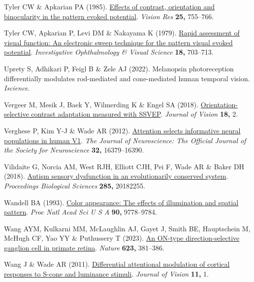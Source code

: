 \documentclass[
  letterpaper,
  DIV=11,
  numbers=noendperiod]{scrartcl}
\newlength{\cslhangindent}
\newenvironment{CSLReferences}[2] %
 {\begin{list}{}{%
  \setlength{\itemindent}{0pt}
  \setlength{\leftmargin}{0pt}
  \setlength{\parsep}{0pt}
  \ifodd #1
   \setlength{\leftmargin}{\cslhangindent}
   \setlength{\itemindent}{-1\cslhangindent}
  \fi
  \setlength{\itemsep}{#2\baselineskip}}}
 {\end{list}}
\begin{document}
\begin{CSLReferences}{1}{1}
Tyler CW \& Apkarian PA (1985).
\href{https://doi.org/10.1016/0042-6989(85)90183-x}{Effects of contrast,
orientation and binocularity in the pattern evoked potential}.
\emph{Vision Res} \textbf{25,} 755--766.

Tyler CW, Apkarian P, Levi DM \& Nakayama K (1979).
\href{https://www.ncbi.nlm.nih.gov/pubmed/447469}{Rapid assessment of
visual function: An electronic sweep technique for the pattern visual
evoked potential}. \emph{Investigative Ophthalmology \& Visual Science}
\textbf{18,} 703--713.

Uprety S, Adhikari P, Feigl B \& Zele AJ (2022). Melanopsin
photoreception differentially modulates rod-mediated and cone-mediated
human temporal vision. \emph{Iscience}.

Vergeer M, Mesik J, Baek Y, Wilmerding K \& Engel SA (2018).
\href{https://doi.org/10.1167/18.5.2}{Orientation-selective contrast
adaptation measured with {SSVEP}}. \emph{Journal of Vision} \textbf{18,}
2.

Verghese P, Kim Y-J \& Wade AR (2012).
\href{https://doi.org/10.1523/JNEUROSCI.1174-12.2012}{Attention selects
informative neural populations in human {V1}}. \emph{The Journal of
Neuroscience: The Official Journal of the Society for Neuroscience}
\textbf{32,} 16379--16390.

Vilidaite G, Norcia AM, West RJH, Elliott CJH, Pei F, Wade AR \& Baker
DH (2018). \href{https://doi.org/10.1098/rspb.2018.2255}{Autism sensory
dysfunction in an evolutionarily conserved system}. \emph{Proceedings
Biological Sciences} \textbf{285,} 20182255.

Wandell BA (1993). \href{https://doi.org/10.1073/pnas.90.21.9778}{Color
appearance: The effects of illumination and spatial pattern}. \emph{Proc
Natl Acad Sci U S A} \textbf{90,} 9778--9784.

Wang AYM, Kulkarni MM, McLaughlin AJ, Gayet J, Smith BE, Hauptschein M,
McHugh CF, Yao YY \& Puthussery T (2023).
\href{https://doi.org/10.1038/s41586-023-06659-4}{An ON-type
direction-selective ganglion cell in primate retina}. \emph{Nature}
\textbf{623,} 381--386.

Wang J \& Wade AR (2011).
\href{https://doi.org/10.1167/11.6.1}{Differential attentional
modulation of cortical responses to {S}-cone and luminance stimuli}.
\emph{Journal of Vision} \textbf{11,} 1.


\end{CSLReferences}
\end{document}
